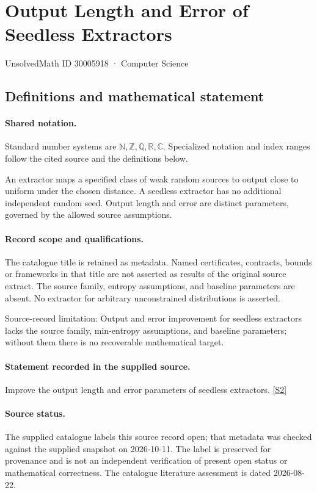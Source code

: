 \documentclass[11pt]{article}
\newcommand{\sref}[2]{\hyperlink{source:#1:#2}{[S#2]}}
\begin{document}
\setcounter{section}{30005917}
\section{Output Length and Error of Seedless Extractors}\label{30005918}
{\small\sffamily UnsolvedMath ID 30005918 · Computer Science}
\subsection{Definitions and mathematical statement}

\paragraph{Shared notation.}Standard number systems are $\mathbb N,\mathbb Z,\mathbb Q,\mathbb R,\mathbb C$. Specialized notation and index ranges follow the cited source and the definitions below.


An extractor maps a specified class of weak random sources to output close to uniform under the chosen distance. A seedless extractor has no additional independent random seed. Output length and error are distinct parameters, governed by the allowed source assumptions.
\paragraph{Record scope and qualifications.}
The catalogue title is retained as metadata. Named certificates, contracts, bounds or frameworks in that title are not asserted as results of the original source extract.
The source family, entropy assumptions, and baseline parameters are absent. No extractor for arbitrary unconstrained distributions is asserted.

Source-record limitation: Output and error improvement for seedless extractors lacks the source family, min-entropy assumptions, and baseline parameters; without them there is no recoverable mathematical target.
\paragraph{Statement recorded in the supplied source.}
Improve the output length and error parameters of seedless extractors. \sref{30005918}{2}
\paragraph{Source status.}
The supplied catalogue labels this source record open; that metadata was checked against the supplied snapshot on 2026-10-11. The label is preserved for provenance and is not an independent verification of present open status or mathematical correctness. The catalogue literature assessment is dated 2026-08-22.
\end{document}
